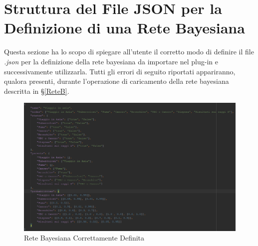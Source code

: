 \section{Struttura del File JSON per la Definizione di una Rete Bayesiana}\label{strutturaRete}

Questa sezione ha lo scopo di spiegare all'utente il corretto modo di definire il file \textit{.json} per la definizione della rete bayesiana da importare nel plug-in e successivamente utilizzarla. Tutti gli errori di seguito riportati appariranno, qualora presenti, durante l'operazione di caricamento della rete bayesiana descritta in §\ref{ReteB}.


\begin{figure}[H]
	\begin{center}
		\includegraphics[scale=0.6]{./images/strutturaRete.png}
		 \caption{Rete Bayesiana Correttamente Definita}	
		 \label{ImgRete}
	\end{center}
\end{figure}

